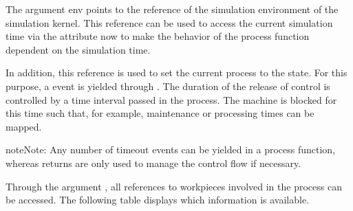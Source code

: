 \documentclass[letterpaper,10pt,english]{sphinxmanual}
\begin{document}
\sphinxAtStartPar
{}

\sphinxAtStartPar
The argument env points to the reference of the simulation environment of the simulation kernel. This reference can be
used to access the current simulation time via the attribute now to make the behavior of the process function dependent
on the simulation time.

\begin{sphinxVerbatim}[commandchars=\\\{\}]
   
\end{sphinxVerbatim}

\sphinxAtStartPar
In addition, this reference is used to set the current process to the  state. For this purpose,
a  event is yielded through . The duration of the release of control is controlled by a time
interval passed in the process. The machine is blocked for this time such that, for example, maintenance or processing
times can be mapped.

\begin{sphinxVerbatim}[commandchars=\\\{\}]
    

 
\end{sphinxVerbatim}

\begin{sphinxadmonition}{note}{Note:}
\sphinxAtStartPar
Any number of timeout events can be yielded in a process function, whereas returns are only used to manage the
control flow if necessary.
\end{sphinxadmonition}

\sphinxAtStartPar
{}

\sphinxAtStartPar
Through the argument , all references to workpieces involved in the process can be accessed. The following table
displays which information is available.
\end{document}
